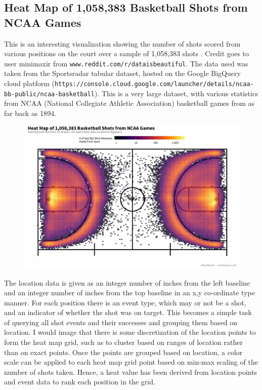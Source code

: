 \documentclass[12pt]{article}
\begin{document}
\subsection{Heat Map of 1,058,383 Basketball Shots from NCAA Games}
This is an interesting visualization showing the number of shots scored from various positions on the court over a sample of 1,058,383 shots \cite{basketball}. Credit goes to user minimaxir from \texttt{www.reddit.com/r/dataisbeautiful}. The data used was taken from the Sportsradar tabular dataset, hosted on the Google BigQuery cloud platform (\texttt{https://console.cloud.google.com/launcher/details/ncaa-bb-public/ncaa-basketball}). This is a very large dataset, with various statistics from NCAA (National Collegiate Athletic Association) basketball games from as far back as 1894.

\begin{figure}[h]
	\centering
	\includegraphics[scale=0.25]{basketball}
\end{figure}

The location data is given as an integer number of inches from the left baseline and an integer number of inches from the top baseline in an x,y co-ordinate type manner. For each position there is an event type, which may or not be a shot, and an indicator of whether the shot was on target. This becomes a simple task of querying all shot events and their successes and grouping them based on location. I would image that there is some discretization of the location points to form the heat map grid, such as to cluster based on ranges of location rather than on exact points. Once the points are grouped based on location, a color scale can be applied to each heat map grid point based on min-max scaling of the number of shots taken. Hence, a heat value has been derived from location points and event data to rank each position in the grid.
\end{document}
